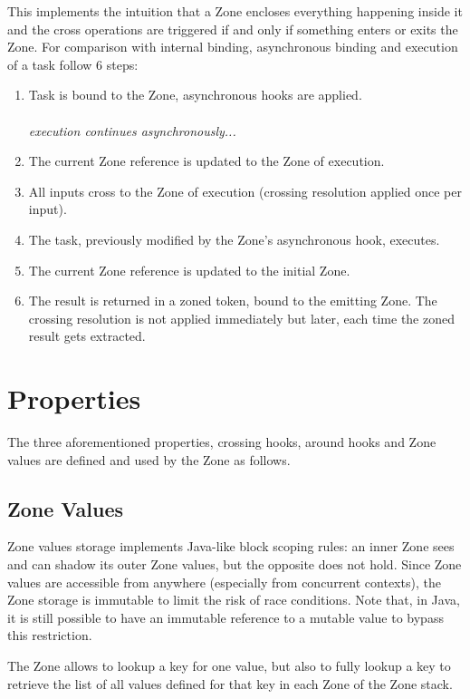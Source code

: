 This implements the intuition that a Zone encloses everything happening inside it and the cross operations are triggered if and only if something enters or exits the Zone.
For comparison with internal binding, asynchronous binding and execution of a task follow 6 steps:

\begin{enumerate}
\item Task is bound to the Zone, asynchronous hooks are applied. \\ \\
\textit{execution continues asynchronously...} \\
\item The current Zone reference is updated to the Zone of execution.
\item All inputs cross to the Zone of execution (crossing resolution applied once per input).
\item The task, previously modified by the Zone's asynchronous hook, executes.
\item The current Zone reference is updated to the initial Zone.
\item The result is returned in a zoned token, bound to the emitting Zone. The crossing resolution is not applied immediately but later, each time the zoned result gets extracted.

\end{enumerate}

\section{Properties} %

The three aforementioned properties, crossing hooks, around hooks and Zone values are defined and used by the Zone as follows.

\subsection*{Zone Values}
Zone values storage implements Java-like block scoping rules: an inner Zone sees and can shadow its outer Zone values, but the opposite does not hold. Since Zone values are accessible from anywhere (especially from concurrent contexts), the Zone storage is immutable to limit the risk of race conditions. Note that, in Java, it is still possible to have an immutable reference to a mutable value to bypass this restriction.

The Zone allows to lookup a key for one value, but also to fully lookup a key to retrieve the list of all values defined for that key in each Zone of the Zone stack.

